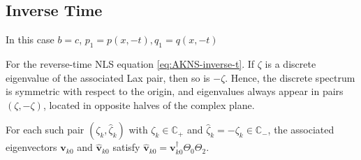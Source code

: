 \subsection{Inverse Time}
In this case $ b = c $, $ p_{1}=p(x,-t), q_{1} = q(x,-t) $
\begin{theorem}
    For the reverse-time NLS equation \eqref{eq:AKNS-inverse-t}. If $\zeta$ is a discrete eigenvalue of the associated Lax pair, then so is $-\zeta$. Hence, the discrete spectrum is symmetric with respect to the origin, and eigenvalues always appear in pairs $(\zeta, -\zeta)$, located in opposite halves of the complex plane.
    
    For each such pair $(\zeta_k, \hat{\zeta}_k)$ with $\zeta_k \in \mathbb{C}_+$ and $\hat{\zeta}_k = -\zeta_k \in \mathbb{C}_-$, the associated eigenvectors $\mathbf{v}_{k0}$ and $\hat{\mathbf{v}}_{k0}$ satisfy $ \hat{\mathbf{v}}_{k0} = \mathbf{v}_{k0}^{\dagger}\Theta_{0}\Theta_{2} $.
\end{theorem}
